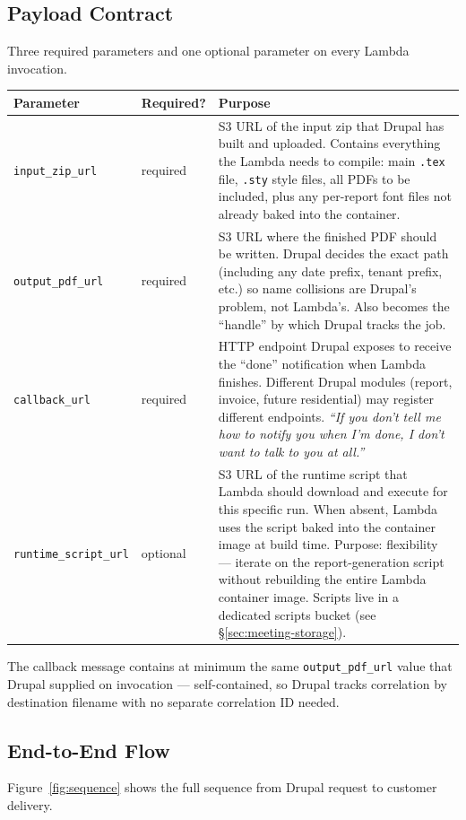\documentclass[11pt,letterpaper]{article}
\begin{document}
\subsection{Payload Contract}
\label{sec:meeting-payload}

Three required parameters and one optional parameter on every Lambda invocation.

\begin{center}
\begin{tabular}{@{}p{3.6cm}p{1.6cm}p{8.3cm}@{}}
\toprule
\textbf{Parameter} & \textbf{Required?} & \textbf{Purpose} \\
\midrule
\texttt{input\_zip\_url} & required & S3 URL of the input zip that Drupal has built and uploaded. Contains everything the Lambda needs to compile: main \texttt{.tex} file, \texttt{.sty} style files, all PDFs to be included, plus any per-report font files not already baked into the container. \\
\texttt{output\_pdf\_url} & required & S3 URL where the finished PDF should be written. Drupal decides the exact path (including any date prefix, tenant prefix, etc.) so name collisions are Drupal's problem, not Lambda's. Also becomes the ``handle'' by which Drupal tracks the job. \\
\texttt{callback\_url} & required & HTTP endpoint Drupal exposes to receive the ``done'' notification when Lambda finishes. Different Drupal modules (report, invoice, future residential) may register different endpoints. \emph{``If you don't tell me how to notify you when I'm done, I don't want to talk to you at all.''} \\
\texttt{runtime\_script\_url} & optional & S3 URL of the runtime script that Lambda should download and execute for this specific run. When absent, Lambda uses the script baked into the container image at build time. Purpose: flexibility --- iterate on the report-generation script without rebuilding the entire Lambda container image. Scripts live in a dedicated scripts bucket (see \S\ref{sec:meeting-storage}). \\
\bottomrule
\end{tabular}
\end{center}

The callback message contains at minimum the same \texttt{output\_pdf\_url} value that Drupal supplied on invocation --- self-contained, so Drupal tracks correlation by destination filename with no separate correlation ID needed.

\subsection{End-to-End Flow}
\label{sec:meeting-flow}
Figure~\ref{fig:sequence} shows the full sequence from Drupal request to customer delivery.
\end{document}
